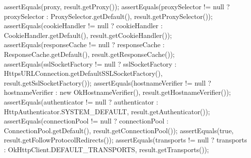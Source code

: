 \begin{answer}
{{        assertEquals(proxy, result.getProxy());
        assertEquals(proxySelector != null ? proxySelector : ProxySelector.getDefault(), result.getProxySelector());
        assertEquals(cookieHandler != null ? cookieHandler : CookieHandler.getDefault(), result.getCookieHandler());
        assertEquals(responseCache != null ? responseCache : ResponseCache.getDefault(), result.getResponseCache());
        assertEquals(sslSocketFactory != null ? sslSocketFactory : HttpsURLConnection.getDefaultSSLSocketFactory(), result.getSslSocketFactory());
        assertEquals(hostnameVerifier != null ? hostnameVerifier : new OkHostnameVerifier(), result.getHostnameVerifier());
        assertEquals(authenticator != null ? authenticator : HttpAuthenticator.SYSTEM_DEFAULT, result.getAuthenticator());
        assertEquals(connectionPool != null ? connectionPool : ConnectionPool.getDefault(), result.getConnectionPool());
        assertEquals(true, result.getFollowProtocolRedirects());
        assertEquals(transports != null ? transports : OkHttpClient.DEFAULT_TRANSPORTS, result.getTransports());
    }
}
\end{answer}

